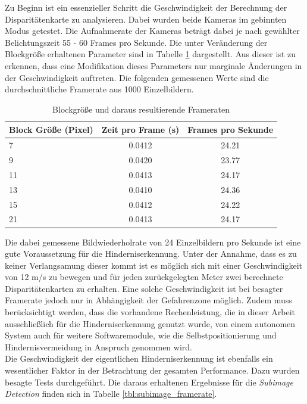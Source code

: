\noindent
Zu Beginn ist ein essenzieller Schritt die Geschwindigkeit der Berechnung der Disparitätenkarte zu analysieren. Dabei wurden beide Kameras im gebinnten Modus getestet. Die Aufnahmerate der Kameras beträgt dabei je nach gewählter Belichtungszeit 55 - 60 Frames pro Sekunde. Die unter Veränderung der Blockgröße erhaltenen Parameter sind in Tabelle \ref{tbl:disparity_framerate} dargestellt. Aus dieser ist zu erkennen, dass eine Modifikation dieses Parameters nur marginale Änderungen in der Geschwindigkeit auftreten. Die folgenden gemessenen Werte sind die durchschnittliche Framerate aus 1000 Einzelbildern.

\begin{table}[h]
	\centering
	\begin{tabular}{|l|c|c|}
	\hline
	Block Größe (Pixel) & Zeit pro Frame (s) & Frames pro Sekunde \\ \hline
	7           & 0.0412         & 24.21              \\ \hline
	9           & 0.0420         & 23.77              \\ \hline
	11          & 0.0413         & 24.17              \\ \hline
	13          & 0.0410         & 24.36              \\ \hline
	15          & 0.0412         & 24.22              \\ \hline
	21          & 0.0413         & 24.17              \\ \hline
	\end{tabular}
	\caption{Blockgröße und daraus resultierende Frameraten}
	\label{tbl:disparity_framerate}
\end{table}

\noindent
Die dabei gemessene Bildwiederholrate von 24 Einzelbildern pro Sekunde ist eine gute Voraussetzung für die Hinderniserkennung. Unter der Annahme, dass es zu keiner Verlangsamung dieser kommt ist es möglich sich mit einer Geschwindigkeit von 12 m/s zu bewegen und für jeden zurückgelegten Meter zwei berechnete Disparitätenkarten zu erhalten. Eine solche Geschwindigkeit ist bei besagter Framerate jedoch nur in Abhängigkeit der Gefahrenzone möglich. Zudem muss berücksichtigt werden, dass die vorhandene Rechenleistung, die in dieser Arbeit ausschließlich für die Hinderniserkennung genutzt wurde, von einem autonomen System auch für weitere Softwaremodule, wie die Selbstpositionierung und Hindernisvermeidung in Anspruch genommen wird.\\

\noindent
Die Geschwindigkeit der eigentlichen Hinderniserkennung ist ebenfalls ein wesentlicher Faktor in der Betrachtung der gesamten Performance. Dazu wurden besagte Tests durchgeführt. Die daraus erhaltenen Ergebnisse für die \emph{Subimage Detection} finden sich in Tabelle \ref{tbl:subimage_framerate}.\\

